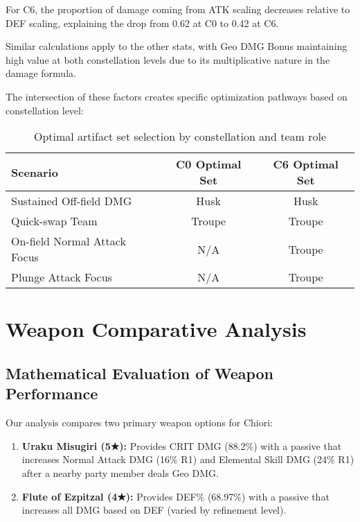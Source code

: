 \documentclass[12pt,a4paper]{article}
\begin{document}
For C6, the proportion of damage coming from ATK scaling decreases relative to DEF scaling, explaining the drop from 0.62 at C0 to 0.42 at C6.

Similar calculations apply to the other stats, with Geo DMG Bonus maintaining high value at both constellation levels due to its multiplicative nature in the damage formula.

The intersection of these factors creates specific optimization pathways based on constellation level:

\begin{table}[h]
\centering
\begin{tabular}{lcc}
\toprule
\textbf{Scenario} & \textbf{C0 Optimal Set} & \textbf{C6 Optimal Set} \\
\midrule
Sustained Off-field DMG & Husk & Husk \\
Quick-swap Team & Troupe & Troupe \\
On-field Normal Attack Focus & N/A & Troupe \\
Plunge Attack Focus & N/A & Troupe \\
\bottomrule
\end{tabular}
\caption{Optimal artifact set selection by constellation and team role}
\label{tab:artifact_selection}
\end{table}

\section{Weapon Comparative Analysis}

\subsection{Mathematical Evaluation of Weapon Performance}

Our analysis compares two primary weapon options for Chiori:

\begin{enumerate}
    \item \textbf{Uraku Misugiri (5★):} Provides CRIT DMG (88.2\%) with a passive that increases Normal Attack DMG (16\% R1) and Elemental Skill DMG (24\% R1) after a nearby party member deals Geo DMG.
    \item \textbf{Flute of Ezpitzal (4★):} Provides DEF\% (68.97\%) with a passive that increases all DMG based on DEF (varied by refinement level).
\end{enumerate}
\end{document}
